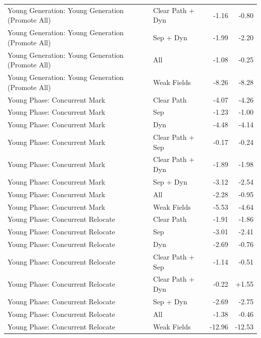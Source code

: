 \begin{table}[t]
\begin{tabular}{llrr}
Young Generation: Young Generation (Promote All) & Clear Path + Dyn & -1.16 & -0.80 \\
Young Generation: Young Generation (Promote All) & Sep + Dyn & -1.99 & -2.20 \\
Young Generation: Young Generation (Promote All) & All & -1.08 & -0.25 \\
Young Generation: Young Generation (Promote All) & Weak Fields & -8.26 & -8.28 \\
Young Phase: Concurrent Mark & Clear Path & -4.07 & -4.26 \\
Young Phase: Concurrent Mark & Sep & -1.23 & -1.00 \\
Young Phase: Concurrent Mark & Dyn & -4.48 & -4.14 \\
Young Phase: Concurrent Mark & Clear Path + Sep & -0.17 & -0.24 \\
Young Phase: Concurrent Mark & Clear Path + Dyn & -1.89 & -1.98 \\
Young Phase: Concurrent Mark & Sep + Dyn & -3.12 & -2.54 \\
Young Phase: Concurrent Mark & All & -2.28 & -0.95 \\
Young Phase: Concurrent Mark & Weak Fields & -5.53 & -4.64 \\
Young Phase: Concurrent Relocate & Clear Path & -1.91 & -1.86 \\
Young Phase: Concurrent Relocate & Sep & -3.01 & -2.41 \\
Young Phase: Concurrent Relocate & Dyn & -2.69 & -0.76 \\
Young Phase: Concurrent Relocate & Clear Path + Sep & -1.14 & -0.51 \\
Young Phase: Concurrent Relocate & Clear Path + Dyn & -0.22 & +1.55 \\
Young Phase: Concurrent Relocate & Sep + Dyn & -2.69 & -2.75 \\
Young Phase: Concurrent Relocate & All & -1.38 & -0.46 \\
Young Phase: Concurrent Relocate & Weak Fields & -12.96 & -12.53 \\
\bottomrule
\end{tabular}
\end{table}
